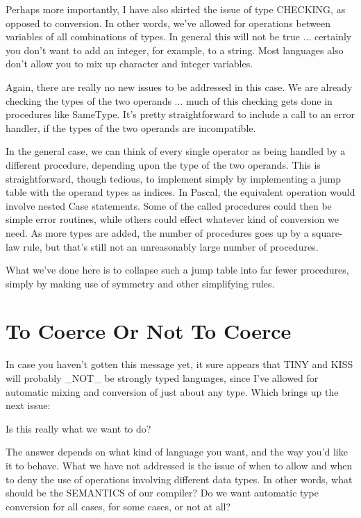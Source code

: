 \documentclass[float=false, crop=false]{standalone}
\begin{document}
Perhaps more importantly, I have also skirted the issue of type CHECKING, as
opposed to conversion. In other words, we've allowed for operations between
variables of all combinations of types. In general this will not be true ...
certainly you don't want to add an integer, for example, to a string. Most
languages also don't allow you to mix up character and integer variables.

Again, there are really no new issues to be addressed in this case. We are
already checking the types of the two operands ... much of this checking gets
done in procedures like SameType. It's pretty straightforward to include a call
to an error handler, if the types of the two operands are incompatible.

In the general case, we can think of every single operator as being handled by a
different procedure, depending upon the type of the two operands. This is
straightforward, though tedious, to implement simply by implementing a jump
table with the operand types as indices. In Pascal, the equivalent operation
would involve nested Case statements. Some of the called procedures could then
be simple error routines, while others could effect whatever kind of conversion
we need. As more types are added, the number of procedures goes up by a
square-law rule, but that's still not an unreasonably large number of
procedures.

What we've done here is to collapse such a jump table into far fewer procedures,
simply by making use of symmetry and other simplifying rules.


\section{To Coerce Or Not To Coerce}

In case you haven't gotten this message yet, it sure appears that TINY and KISS
will probably _NOT_ be strongly typed languages, since I've allowed for
automatic mixing and conversion of just about any type. Which brings up the next
issue:

                Is this really what we want to do?

The answer depends on what kind of language you want, and the way you'd like it
to behave. What we have not addressed is the issue of when to allow and when to
deny the use of operations involving different data types. In other words, what
should be the SEMANTICS of our compiler? Do we want automatic type conversion
for all cases, for some cases, or not at all?
\end{document}
